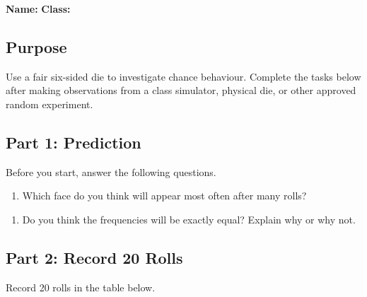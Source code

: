 \noindent\textbf{Name:} \underline{\hspace{7.5cm}} \hfill \textbf{Class:} \underline{\hspace{2.8cm}}

\subsection{Purpose}\label{purpose}

Use a fair six-sided die to investigate chance behaviour. Complete the
tasks below after making observations from a class simulator, physical
die, or other approved random experiment.

\subsection{Part 1: Prediction}\label{part-1-prediction}

Before you start, answer the following questions.

\begin{enumerate}
\def\labelenumi{\arabic{enumi}.}
\tightlist
\item
  Which face do you think will appear most often after many rolls?
\end{enumerate}

\vspace{1.8cm}

\begin{enumerate}
\def\labelenumi{\arabic{enumi}.}
\setcounter{enumi}{1}
\tightlist
\item
  Do you think the frequencies will be exactly equal? Explain why or why
  not.
\end{enumerate}

\vspace{2.5cm}

\subsection{Part 2: Record 20 Rolls}\label{part-2-record-20-rolls}

Record 20 rolls in the table below.

